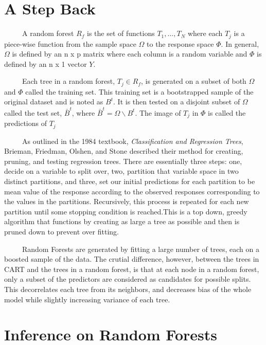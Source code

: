 \documentclass[12pt,twoside]{reedthesis}
\begin{document}
  \section{A Step Back}\label{a-step-back}
  
  ~~~~~A random forest \(R_f\) is the set of functions \(T_1,...,T_N\)
  where each \(T_j\) is a piece-wise function from the sample space
  \(\Omega\) to the response space \(\Phi\). In general, \(\Omega\) is
  defined by an n x p matrix where each column is a random variable and
  \(\Phi\) is defined by an n x 1 vector \(Y\).
  
  ~~~~~Each tree in a random forest, \(T_j \in R_f\), is generated on a
  subset of both \(\Omega\) and \(\Phi\) called the training set. This
  training set is a bootstrapped sample of the original dataset and is
  noted as \({B}^t\). It is then tested on a disjoint subset of \(\Omega\)
  called the test set, \(\bar{B}^t\), where
  \(\bar{B}^t = \Omega \backslash B^t\). The image of \(T_j\) in \(\Phi\)
  is called the predictions of \(T_j\)
  
  ~~~~~As outlined in the 1984 textbook, \emph{Classification and
  Regression Trees}, Brieman, Friedman, Olshen, and Stone described their
  method for creating, pruning, and testing regression trees. There are
  essentially three steps: one, decide on a variable to split over, two,
  partition that variable space in two distinct partitions, and three, set
  our initial predictions for each partition to be mean value of the
  response according to the observed responses corresponding to the values
  in the partitions. Recursively, this process is repeated for each new
  partition until some stopping condition is reached.This is a top down,
  greedy algorithm that functions by creating as large a tree as possible
  and then is pruned down to prevent over fitting.
  
  ~~~~~Random Forests are generated by fitting a large number of trees,
  each on a boosted sample of the data. The crutial difference, however,
  between the trees in CART and the trees in a random forest, is that at
  each node in a random forest, only a subset of the predictors are
  considered as candidates for possible splits. This decorrelates each
  tree from its neighbors, and decreases bias of the whole model while
  slightly increasing variance of each tree.
  
  \section{Inference on Random Forests}\label{inference-on-random-forests}
  
\end{document}
